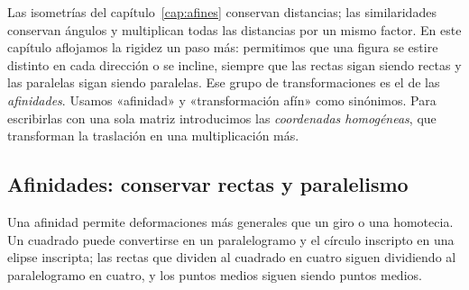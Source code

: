 Las isometrías del capítulo~\ref{cap:afines} conservan distancias; las similaridades conservan
ángulos y multiplican todas las distancias por un mismo factor. En este capítulo aflojamos
la rigidez un paso más: permitimos que una figura se estire distinto en cada dirección o se
incline, siempre que las rectas sigan siendo rectas y las paralelas sigan siendo paralelas.
Ese grupo de transformaciones es el de las \emph{afinidades}. Usamos «afinidad» y
«transformación afín» como sinónimos. Para escribirlas con una sola matriz introducimos las
\emph{coordenadas homogéneas}, que transforman la traslación en una multiplicación más.

\subsection{Afinidades: conservar rectas y paralelismo}\label{sec:afinidades-primera}

{\small\vspace{1mm}\par}

Una afinidad permite deformaciones más generales que un giro o una homotecia. Un cuadrado
puede convertirse en un paralelogramo y el círculo inscripto en una elipse inscripta; las
rectas que dividen al cuadrado en cuatro siguen dividiendo al paralelogramo en cuatro, y los
puntos medios siguen siendo puntos medios.

\begin{center}
\end{center}

